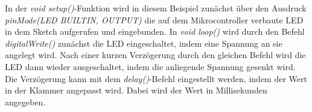 In der \textit{void setup()}-Funktion wird in diesem Beispiel zunächst über den Ausdruck \textit{pinMode(LED BUILTIN, OUTPUT)} die auf dem Mikrocontroller verbaute LED in dem Sketch aufgerufen und eingebunden.
In \textit{void loop()} wird durch den Befehl\textit{ digitalWrite()} zunächst die LED eingeschaltet, indem eine Spannung an sie angelegt wird. Nach einer kurzen Verzögerung durch den gleichen Befehl wird die LED dann wieder ausgeschaltet, indem die anliegende Spannung gesenkt wird. Die Verzögerung kann mit dem \textit{delay()}-Befehl eingestellt werden, indem der Wert in der Klammer angepasst wird. Dabei wird der Wert in Millisekunden angegeben.
